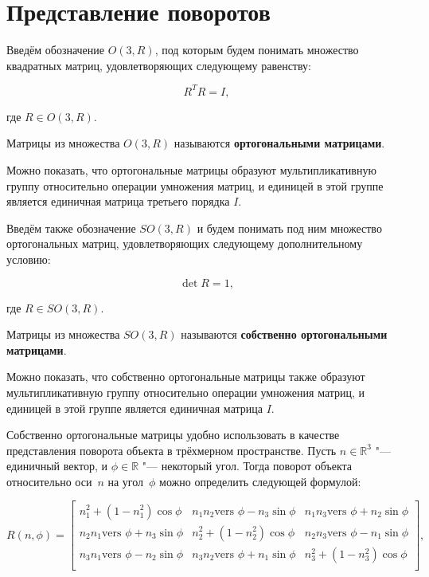 \section{Представление поворотов}

Введём обозначение $O(3,R)$, под которым будем понимать множество квадратных матриц, удовлетворяющих следующему
равенству:

$$R^T R=I,$$

\noindent где $R \in O(3,R)$.

\begin{definition}
Матрицы из множества $O(3,R)$ называются \textbf{ортогональными матрицами}.
\end{definition}

Можно показать, что ортогональные матрицы образуют мультипликативную группу относительно операции умножения матриц, и
единицей в этой группе является единичная матрица третьего порядка $I$.

Введём также обозначение $SO(3,R)$ и будем понимать под ним множество ортогональных матриц, удовлетворяющих
следующему дополнительному условию:

$$\det R = 1,$$

\noindent где $R \in SO(3, R)$.

\begin{definition}
Матрицы из множества $SO(3,R)$ называются \textbf{собственно ортогональными матрицами}.
\end{definition}

Можно показать, что собственно ортогональные матрицы также образуют мультипликативную группу относительно операции
умножения матриц, и единицей в этой группе является единичная матрица $I$.

Собственно ортогональные матрицы удобно использовать в качестве представления поворота объекта в трёхмерном
пространстве. Пусть $n \in \mathbb{R}^3$ "--- единичный вектор, и $\phi \in \mathbb{R}$ "--- некоторый угол. Тогда
поворот объекта относительно оси~$n$ на угол~$\phi$ можно определить следующей формулой:

\begin{equation}
R(n,\phi)=
\left[ {\begin{array}{ccc}
    n_1^2+(1-n_1^2)\cos \phi                 & n_1 n_2\textrm{vers } \phi-n_3 \sin \phi & n_1 n_3\textrm{vers } \phi+n_2 \sin \phi \\
    n_2 n_1\textrm{vers } \phi+n_3 \sin \phi & n_2^2+(1-n_2^2)\cos \phi                 & n_2 n_3\textrm{vers } \phi-n_1 \sin \phi \\
    n_3 n_1\textrm{vers } \phi-n_2 \sin \phi & n_3 n_2\textrm{vers } \phi+n_1 \sin \phi & n_3^2+(1-n_3^2)\cos \phi                 \\
\end{array} } \right],
\label{rotation-matrix}
\end{equation}

